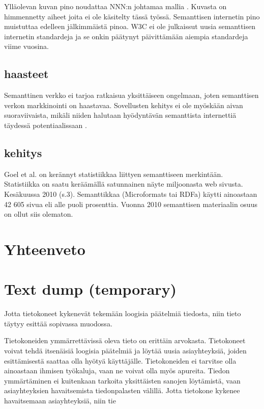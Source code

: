 \documentclass[finnish, 12pt, a4paper, elec, utf8, pdfa, online]{aaltothesis}
\begin{document}
Ylläolevan kuvan pino noudattaa NNN:n johtamaa mallia \cite{stack}. Kuvasta on himmennetty aiheet joita ei ole käsitelty tässä työssä. Semanttisen internetin pino muistuttaa edelleen jälkimmäistä pinoa. W3C ei ole julkaissut uusia semanttisen internetin standardeja ja se onkin päätynyt päivittämään aiempia standardeja viime vuosina.


\clearpage %

\subsection{haasteet}
Semanttinen verkko ei tarjoa ratkaisua yksittäiseen ongelmaan, joten semanttisen verkon markkinointi on haastavaa. Sovellusten kehitys ei ole myöskään aivan suoraviivaista, mikäli niiden halutaan hyödyntävän semanttista internettiä täydessä potentiaalissaan \cite{lassila_dissertion}.

\subsection{kehitys}
Goel et al. on kerännyt statistiikkaa liittyen semanttiseen merkintään. Statistiikka on saatu keräämällä satunnainen näyte miljoonasta web sivusta. Kesäkuussa 2010 \cite{Google} (s.3). Semanttikkaa (Microformats tai RDFa) käytti ainoastaan 42 605 sivua eli alle puoli prosenttia. Vuonna 2010 semanttisen materiaalin osuus on ollut siis olematon.

\clearpage
\section{Yhteenveto}



\clearpage
\section{Text dump (temporary)}

Jotta tietokoneet kykenevät tekemään loogisia päätelmiä tiedosta, niin tieto täytyy esittää sopivassa muodossa.

Tietokoneiden ymmärrettävissä oleva tieto on erittäin arvokasta. Tietokoneet voivat tehdä itsenäisiä loogisia päätelmiä ja löytää uusia asiayhteyksiä, joiden esittämisestä saattaa olla hyötyä käyttäjälle. Tietokoneiden ei tarvitse olla ainoastaan ihmisen työkaluja, vaan ne voivat olla myös apureita. Tiedon ymmärtäminen ei kuitenkaan tarkoita yksittäisten sanojen löytämistä, vaan asiayhteyksien havaitsemista tiedonpalasten välillä. Jotta tietokone kykenee havaitsemaan asiayhteyksiä, niin tie
\end{document}

